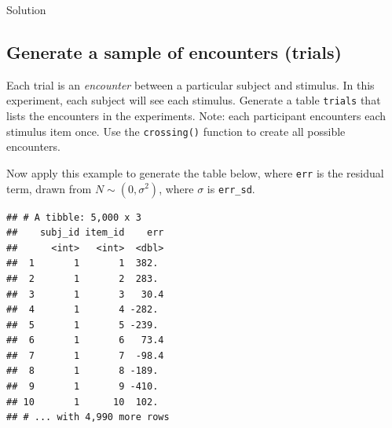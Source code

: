 \documentclass[]{book}
\newenvironment{Shaded}{\begin{snugshade}}{\end{snugshade}}
\newcommand{\DataTypeTok}[1]{\textcolor[rgb]{0.13,0.29,0.53}{#1}}
\newcommand{\DecValTok}[1]{\textcolor[rgb]{0.00,0.00,0.81}{#1}}
\newcommand{\KeywordTok}[1]{\textcolor[rgb]{0.13,0.29,0.53}{\textbf{#1}}}
\newcommand{\NormalTok}[1]{#1}
\newcommand{\OperatorTok}[1]{\textcolor[rgb]{0.81,0.36,0.00}{\textbf{#1}}}
\newcommand{\StringTok}[1]{\textcolor[rgb]{0.31,0.60,0.02}{#1}}
\begin{document}
Solution

\begin{Shaded}
\end{Shaded}

\hypertarget{generate-a-sample-of-encounters-trials}{%
\subsection{Generate a sample of encounters (trials)}\label{generate-a-sample-of-encounters-trials}}

Each trial is an \emph{encounter} between a particular subject and stimulus. In this experiment, each subject will see each stimulus. Generate a table \texttt{trials} that lists the encounters in the experiments. Note: each participant encounters each stimulus item once. Use the \texttt{crossing()} function to create all possible encounters.

Now apply this example to generate the table below, where \texttt{err} is the residual term, drawn from \(N \sim \left(0, \sigma^2\right)\), where \(\sigma\) is \texttt{err\_sd}.

\begin{verbatim}
## # A tibble: 5,000 x 3
##    subj_id item_id    err
##      <int>   <int>  <dbl>
##  1       1       1  382. 
##  2       1       2  283. 
##  3       1       3   30.4
##  4       1       4 -282. 
##  5       1       5 -239. 
##  6       1       6   73.4
##  7       1       7  -98.4
##  8       1       8 -189. 
##  9       1       9 -410. 
## 10       1      10  102. 
## # ... with 4,990 more rows
\end{verbatim}
\end{document}
